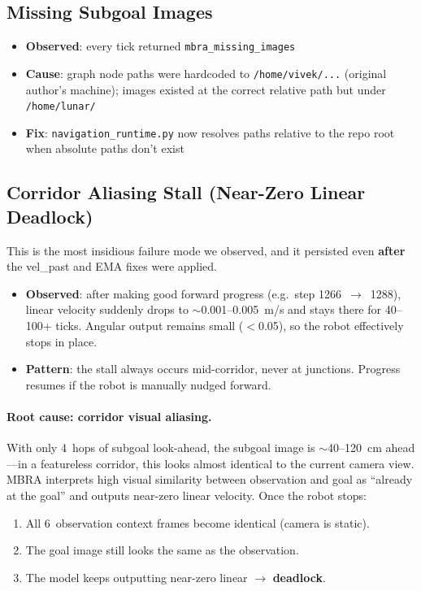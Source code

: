 \documentclass[11pt,a4paper]{article}
\begin{document}
\subsection{Missing Subgoal Images}

\begin{itemize}[nosep]
  \item \textbf{Observed}: every tick returned \texttt{mbra\_missing\_images}
  \item \textbf{Cause}: graph node paths were hardcoded to
    \texttt{/home/vivek/...} (original author's machine); images existed at
    the correct relative path but under \texttt{/home/lunar/}
  \item \textbf{Fix}: \texttt{navigation\_runtime.py} now resolves paths
    relative to the repo root when absolute paths don't exist
\end{itemize}

\subsection{Corridor Aliasing Stall (Near-Zero Linear Deadlock)}

This is the most insidious failure mode we observed, and it persisted even
\textbf{after} the vel\_past and EMA fixes were applied.

\begin{itemize}[nosep]
  \item \textbf{Observed}: after making good forward progress (e.g.\ step
    1266~$\rightarrow$~1288), linear velocity suddenly drops to
    $\sim$0.001--0.005~m/s and stays there for 40--100+ ticks.  Angular output
    remains small ($<$0.05), so the robot effectively stops in place.
  \item \textbf{Pattern}: the stall always occurs mid-corridor, never at
    junctions.  Progress resumes if the robot is manually nudged forward.
\end{itemize}

\paragraph{Root cause: corridor visual aliasing.}
With only 4~hops of subgoal look-ahead, the subgoal image is $\sim$40--120~cm
ahead---in a featureless corridor, this looks almost identical to the current
camera view.  MBRA interprets high visual similarity between observation and
goal as ``already at the goal'' and outputs near-zero linear velocity.  Once
the robot stops:
\begin{enumerate}[nosep]
  \item All 6~observation context frames become identical (camera is static).
  \item The goal image still looks the same as the observation.
  \item The model keeps outputting near-zero linear $\rightarrow$ \textbf{deadlock}.
\end{enumerate}
\end{document}
